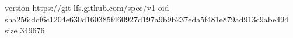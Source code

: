version https://git-lfs.github.com/spec/v1
oid sha256:dcf6c1204e630d160385f460927d197a9b9b237eda5f481e879ad913c9abe494
size 349676
